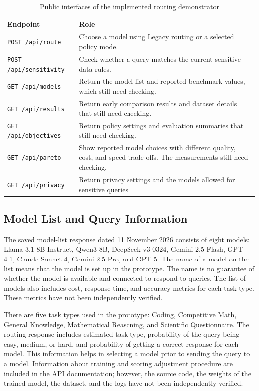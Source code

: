 \begin{table}[!htbp]
\centering\small
\caption{Public interfaces of the implemented routing demonstrator}
\renewcommand{\arraystretch}{1.20}
\setlength{\extrarowheight}{1pt}
\begin{tabular}{|P{0.30\textwidth}|P{0.60\textwidth}|}
\hline
\textbf{Endpoint} & \textbf{Role} \\ \hline
\texttt{POST /api/route} & Choose a model using Legacy routing or a selected policy mode. \\ \hline
\texttt{POST /api/sensitivity} & Check whether a query matches the current sensitive-data rules. \\ \hline
\texttt{GET /api/models} & Return the model list and reported benchmark values, which still need checking. \\ \hline
\texttt{GET /api/results} & Return early comparison results and dataset details that still need checking. \\ \hline
\texttt{GET /api/objectives} & Return policy settings and evaluation summaries that still need checking. \\ \hline
\texttt{GET /api/pareto} & Show reported model choices with different quality, cost, and speed trade-offs. The measurements still need checking. \\ \hline
\texttt{GET /api/privacy} & Return privacy settings and the models allowed for sensitive queries. \\ \hline
\end{tabular}
\label{tab:implemented_api}
\end{table}

\subsection{Model List and Query Information}
The saved model-list response dated 11 November 2026 consists of eight models: Llama-3.1-8B-Instruct, Qwen3-8B, DeepSeek-v3-0324, Gemini-2.5-Flash, GPT-4.1, Claude-Sonnet-4, Gemini-2.5-Pro, and GPT-5. The name of a model on the list means that the model is set up in the prototype. The name is no guarantee of whether the model is available and connected to respond to queries. The list of models also includes cost, response time, and accuracy metrics for each task type. These metrics have not been independently verified.

There are five task types used in the prototype: Coding, Competitive Math, General Knowledge, Mathematical Reasoning, and Scientific Questionnaire. The routing response includes estimated task type, probability of the query being easy, medium, or hard, and probability of getting a correct response for each model. This information helps in selecting a model prior to sending the query to a model. Information about training and scoring adjustment procedure are included in the API documentation; however, the source code, the weights of the trained model, the dataset, and the logs have not been independently verified.

